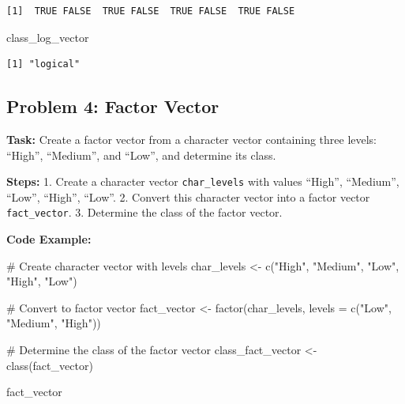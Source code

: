 \documentclass[
  letterpaper,
  DIV=11,
  numbers=noendperiod]{scrreprt}
\newenvironment{Shaded}{\begin{snugshade}}{\end{snugshade}}
\newcommand{\AttributeTok}[1]{\textcolor[rgb]{0.40,0.45,0.13}{#1}}
\newcommand{\CommentTok}[1]{\textcolor[rgb]{0.37,0.37,0.37}{#1}}
\newcommand{\FunctionTok}[1]{\textcolor[rgb]{0.28,0.35,0.67}{#1}}
\newcommand{\NormalTok}[1]{\textcolor[rgb]{0.00,0.23,0.31}{#1}}
\newcommand{\OtherTok}[1]{\textcolor[rgb]{0.00,0.23,0.31}{#1}}
\newcommand{\StringTok}[1]{\textcolor[rgb]{0.13,0.47,0.30}{#1}}
\begin{document}
\begin{verbatim}
[1]  TRUE FALSE  TRUE FALSE  TRUE FALSE  TRUE FALSE
\end{verbatim}

\begin{Shaded}
\begin{Highlighting}[]
\NormalTok{class\_log\_vector}
\end{Highlighting}
\end{Shaded}

\begin{verbatim}
[1] "logical"
\end{verbatim}

\subsection*{Problem 4: Factor Vector}\label{problem-4-factor-vector}

\textbf{Task:} Create a factor vector from a character vector containing
three levels: ``High'', ``Medium'', and ``Low'', and determine its
class.

\textbf{Steps:} 1. Create a character vector \texttt{char\_levels} with
values ``High'', ``Medium'', ``Low'', ``High'', ``Low''. 2. Convert this
character vector into a factor vector \texttt{fact\_vector}. 3.
Determine the class of the factor vector.

\textbf{Code Example:}

\begin{Shaded}
\begin{Highlighting}[]
\CommentTok{\# Create character vector with levels}
\NormalTok{char\_levels }\OtherTok{\textless{}{-}} \FunctionTok{c}\NormalTok{(}\StringTok{"High"}\NormalTok{, }\StringTok{"Medium"}\NormalTok{, }\StringTok{"Low"}\NormalTok{, }\StringTok{"High"}\NormalTok{, }\StringTok{"Low"}\NormalTok{)}

\CommentTok{\# Convert to factor vector}
\NormalTok{fact\_vector }\OtherTok{\textless{}{-}} \FunctionTok{factor}\NormalTok{(char\_levels, }\AttributeTok{levels =} \FunctionTok{c}\NormalTok{(}\StringTok{"Low"}\NormalTok{, }\StringTok{"Medium"}\NormalTok{, }\StringTok{"High"}\NormalTok{))}

\CommentTok{\# Determine the class of the factor vector}
\NormalTok{class\_fact\_vector }\OtherTok{\textless{}{-}} \FunctionTok{class}\NormalTok{(fact\_vector)}

\NormalTok{fact\_vector}
\end{Highlighting}
\end{Shaded}
\end{document}
